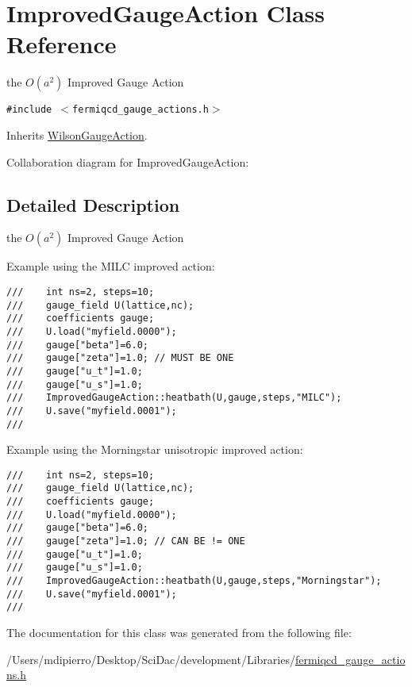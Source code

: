 \hypertarget{class_improved_gauge_action}{
\section{ImprovedGaugeAction Class Reference}
\label{class_improved_gauge_action}
}
the $ O(a^2)$ Improved Gauge Action  


{\tt \#include $<$fermiqcd\_\-gauge\_\-actions.h$>$}

Inherits \hyperlink{class_wilson_gauge_action}{WilsonGaugeAction}.

Collaboration diagram for ImprovedGaugeAction:

\subsection{Detailed Description}
the $ O(a^2)$ Improved Gauge Action 

Example using the MILC improved action: 

\footnotesize\begin{verbatim}
///    int ns=2, steps=10;
///    gauge_field U(lattice,nc);
///    coefficients gauge;
///    U.load("myfield.0000");
///    gauge["beta"]=6.0;
///    gauge["zeta"]=1.0; // MUST BE ONE
///    gauge["u_t"]=1.0;
///    gauge["u_s"]=1.0;
///    ImprovedGaugeAction::heatbath(U,gauge,steps,"MILC");
///    U.save("myfield.0001");
/// \end{verbatim}
\normalsize
 Example using the Morningstar unisotropic improved action: 

\footnotesize\begin{verbatim}
///    int ns=2, steps=10;
///    gauge_field U(lattice,nc);
///    coefficients gauge;
///    U.load("myfield.0000");
///    gauge["beta"]=6.0;
///    gauge["zeta"]=1.0; // CAN BE != ONE
///    gauge["u_t"]=1.0;
///    gauge["u_s"]=1.0;
///    ImprovedGaugeAction::heatbath(U,gauge,steps,"Morningstar");
///    U.save("myfield.0001");
/// \end{verbatim}
\normalsize
 

The documentation for this class was generated from the following file:\begin{CompactItemize}
\item 
/Users/mdipierro/Desktop/SciDac/development/Libraries/\hyperlink{fermiqcd__gauge__actions_8h}{fermiqcd\_\-gauge\_\-actions.h}\end{CompactItemize}
